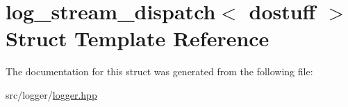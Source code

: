\hypertarget{structlog__stream__dispatch}{\section{log\-\_\-stream\-\_\-dispatch$<$ dostuff $>$ Struct Template Reference}
\label{structlog__stream__dispatch}
}


The documentation for this struct was generated from the following file\-:\begin{DoxyCompactItemize}
\item 
src/logger/\hyperlink{logger_8hpp}{logger.\-hpp}\end{DoxyCompactItemize}
